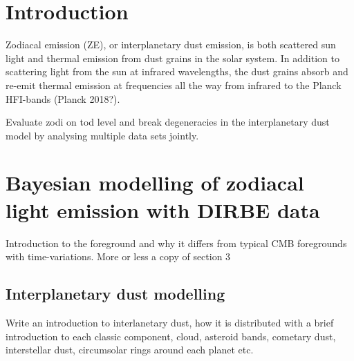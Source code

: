 \documentclass{aa}
\def\Cosmoglobe{\textsc{Cosmoglobe}}
\begin{document}

   \maketitle

\setcounter{tocdepth}{3}
\tableofcontents
   
\section{Introduction}
Zodiacal emission (ZE), or interplanetary dust emission, is both scattered sun light and thermal emission from dust grains in the solar system. In addition to scattering light from the sun at infrared wavelengths, the dust grains absorb and re-emit thermal emission at frequencies all the way from infrared to the Planck HFI-bands (Planck 2018?). 

Evaluate zodi on tod level and break degeneracies in the interplanetary dust model by analysing multiple data sets jointly.

\clearpage
\section{Bayesian modelling of zodiacal light emission with DIRBE data}
Introduction to the foreground and why it differs from typical CMB foregrounds with time-variations. More or less a copy of \cite{ZODIPY} section 3

\subsection{Interplanetary dust modelling}
Write an introduction to interlanetary dust, how it is distributed with a brief introduction to each classic component, cloud, asteroid bands, cometary dust, interstellar dust, circumsolar rings around each planet etc.
\end{document}

